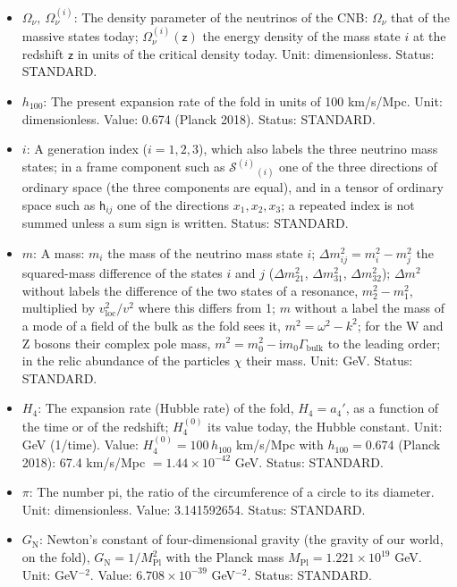 \documentclass[
  10pt,
]{article}
\begin{document}
\begin{itemize}
  (Planck 2018). Status: DERIVED.
\item
  \(\Omega_\nu,\ \Omega_\nu^{(i)}\): The density parameter of the
  neutrinos of the CNB: \(\Omega_\nu\) that of the massive states today;
  \(\Omega_\nu^{(i)}(\mathsf{z})\) the energy density of the mass state
  \(i\) at the redshift \(\mathsf{z}\) in units of the critical density
  today. Unit: dimensionless. Status: STANDARD.
\item
  \(h_{100}\): The present expansion rate of the fold in units of 100
  km/s/Mpc. Unit: dimensionless. Value: 0.674 (Planck 2018). Status:
  STANDARD.
\item
  \(i\): A generation index (\(i = 1, 2, 3\)), which also labels the
  three neutrino mass states; in a frame component such as
  \(\mathcal{S}^{(i)}{}_{(i)}\) one of the three directions of ordinary
  space (the three components are equal), and in a tensor of ordinary
  space such as \(\mathsf{h}_{ij}\) one of the directions
  \(x_1, x_2, x_3\); a repeated index is not summed unless a sum sign is
  written. Status: STANDARD.
\item
  \(m\): A mass: \(m_i\) the mass of the neutrino mass state \(i\);
  \(\Delta m_{ij}^2 = m_i^2 - m_j^2\) the squared-mass difference of the
  states \(i\) and \(j\) (\(\Delta m_{21}^2\), \(\Delta m_{31}^2\),
  \(\Delta m_{32}^2\)); \(\Delta m^2\) without labels the difference of
  the two states of a resonance, \(m_2^2 - m_1^2\), multiplied by
  \(v_{\mathrm{loc}}^2/v^2\) where this differs from 1; \(m\) without a
  label the mass of a mode of a field of the bulk as the fold sees it,
  \(m^2 = \omega^2 - k^2\); for the W and Z bosons their complex pole
  mass, \(m^2 = m_0^2 - \mathrm{i}m_0\Gamma_{\mathrm{bulk}}\) to the
  leading order; in the relic abundance of the particles \(\chi\) their
  mass. Unit: GeV. Status: STANDARD.
\item
  \(H_4\): The expansion rate (Hubble rate) of the fold, \(H_4 = a_4'\),
  as a function of the time or of the redshift; \(H_4^{(0)}\) its value
  today, the Hubble constant. Unit: GeV (1/time). Value:
  \(H_4^{(0)} = 100\,h_{100}\) km/s/Mpc with \(h_{100} = 0.674\) (Planck
  2018): 67.4 km/s/Mpc \(= 1.44\times10^{-42}\) GeV. Status: STANDARD.
\item
  \(\pi\): The number pi, the ratio of the circumference of a circle to
  its diameter. Unit: dimensionless. Value: 3.141592654. Status:
  STANDARD.
\item
  \(G_{\mathrm{N}}\): Newton's constant of four-dimensional gravity (the
  gravity of our world, on the fold),
  \(G_{\mathrm{N}} = 1/M_{\mathrm{Pl}}^2\) with the Planck mass
  \(M_{\mathrm{Pl}} = 1.221\times10^{19}\) GeV. Unit: GeV\(^{-2}\).
  Value: \(6.708\times10^{-39}\) GeV\(^{-2}\). Status: STANDARD.
\end{itemize}
\end{document}
